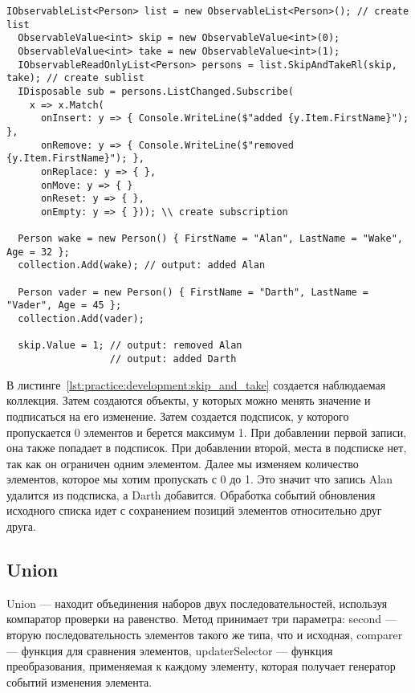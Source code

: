 \begin{lstlisting}[style=csharpinlinestyle, caption={Пример использования SkipAndTake}, label=lst:practice:development:skip_and_take]
  IObservableList<Person> list = new ObservableList<Person>(); // create list
  ObservableValue<int> skip = new ObservableValue<int>(0);
  ObservableValue<int> take = new ObservableValue<int>(1);
  IObservableReadOnlyList<Person> persons = list.SkipAndTakeRl(skip, take); // create sublist
  IDisposable sub = persons.ListChanged.Subscribe(
    x => x.Match(
      onInsert: y => { Console.WriteLine($"added {y.Item.FirstName}"); },
      onRemove: y => { Console.WriteLine($"removed {y.Item.FirstName}"); },
      onReplace: y => { },
      onMove: y => { }
      onReset: y => { },
      onEmpty: y => { })); \\ create subscription

  Person wake = new Person() { FirstName = "Alan", LastName = "Wake", Age = 32 };
  collection.Add(wake); // output: added Alan

  Person vader = new Person() { FirstName = "Darth", LastName = "Vader", Age = 45 };
  collection.Add(vader);

  skip.Value = 1; // output: removed Alan
                  // output: added Darth
\end{lstlisting}

В листинге~\ref{lst:practice:development:skip_and_take} создается наблюдаемая коллекция. Затем создаются объекты, у которых можно менять значение и подписаться на его изменение.
Затем создается подсписок, у которого пропускается 0 элементов и берется максимум 1. При добавлении первой записи, она также попадает в подсписок.
При добавлении второй, места в подсписке нет, так как он ограничен одним элементом. Далее мы изменяем количество элементов, которое мы хотим пропускать с 0 до 1. Это значит что запись Alan удалится
из подсписка, а Darth добавится. Обработка событий обновления исходного списка идет с сохранением позиций элементов относительно друг друга.

\subsection{Union}
\label{sub:development:union}

Union --- находит объединения наборов двух последовательностей, используя компаратор проверки на равенство.
Метод принимает три параметра: second --- вторую последовательность элементов такого же типа, что и исходная,
comparer --- функция для сравнения элементов, updaterSelector --- функция преобразования, применяемая к каждому элементу, которая получает генератор событий изменения элемента.

